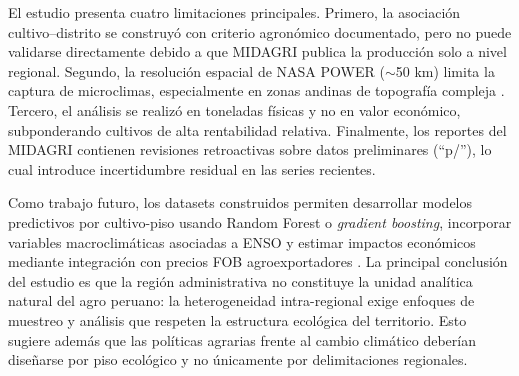 \documentclass[conference]{IEEEtran}
\begin{document}
El estudio presenta cuatro limitaciones principales. Primero, la asociación cultivo--distrito se construyó con criterio agronómico documentado, pero no puede validarse directamente debido a que MIDAGRI publica la producción solo a nivel regional. Segundo, la resolución espacial de NASA POWER ($\sim$50 km) limita la captura de microclimas, especialmente en zonas andinas de topografía compleja \cite{ramirez2012}. Tercero, el análisis se realizó en toneladas físicas y no en valor económico, subponderando cultivos de alta rentabilidad relativa. Finalmente, los reportes del MIDAGRI contienen revisiones retroactivas sobre datos preliminares (``p/''), lo cual introduce incertidumbre residual en las series recientes.

Como trabajo futuro, los datasets construidos permiten desarrollar modelos predictivos por cultivo-piso usando Random Forest o \textit{gradient boosting}, incorporar variables macroclimáticas asociadas a ENSO y estimar impactos económicos mediante integración con precios FOB agroexportadores \cite{chlingaryan2018}. La principal conclusión del estudio es que la región administrativa no constituye la unidad analítica natural del agro peruano: la heterogeneidad intra-regional exige enfoques de muestreo y análisis que respeten la estructura ecológica del territorio. Esto sugiere además que las políticas agrarias frente al cambio climático deberían diseñarse por piso ecológico y no únicamente por delimitaciones regionales.
\end{document}
